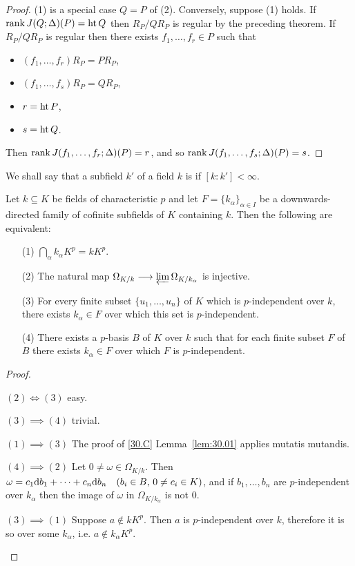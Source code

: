 \documentclass[../main]{subfiles}
\begin{document}
\begin{proof}
(1) is a special case $Q = P$ of (2). Conversely, suppose (1) holds. If $\operatorname{rank} J(Q; \Delta)(P) = \operatorname{ht} Q$ then $R_P/Q R_P$ is regular by the preceding theorem. If $R_P/Q R_P$ is regular then there exists $f_1, \ldots, f_r \in P$ such that
\begin{itemize}
    \item $(f_1, \ldots, f_r)R_P = PR_P$,
    \item  $(f_1, \ldots, f_s)R_P = Q R_P$,
    \item  $r = \operatorname{ht} P$,
    \item  $s = \operatorname{ht} Q$.
\end{itemize}
 Then $\operatorname{rank} J(f_1, \dots, f_r; \Delta)(P) = r$, and so $\operatorname{rank} J(f_1, \dots, f_s; \Delta)(P) = s$.
\end{proof}

\newparagraph We shall say that a subfield $k'$ of a field $k$ is  if $[k : k'] < \infty$.

\begin{lemma}
\label{lem:40.1}
Let $k \subseteq K$ be fields of characteristic $p$ and let $F = \{k_\alpha\}_{\alpha \in I}$ be a downwards-directed family of cofinite subfields of $K$ containing $k$. Then the following are equivalent:
\begin{enumerate}
    \item[(1)] $\bigcap\limits_\alpha k_\alpha K^p = k K^p$.
    \item[(2)] The natural map $\Omega_{K/k} \longrightarrow \varprojlim \Omega_{K/k_\alpha}$ is injective.
    \item[(3)] For every finite subset $\{u_1, \ldots, u_n\}$ of $K$ which is $p$-independent over $k$, there exists $k_\alpha \in F$ over which this set is $p$-independent. 
    \item[(4)] There exists a $p$-basis $B$ of $K$ over $k$ such that for each finite subset $F$ of $B$ there exists $k_\alpha \in F$ over which $F$ is $p$-independent. 
\end{enumerate}
\end{lemma}

\begin{proof}\phantom{,}
\begin{implyenumerate}
    \item[$(2) \iff (3)$] easy.
    \item[$(3) \implies (4)$] trivial.
    \item[$(1) \implies (3)$] The proof of \ref{30.C} Lemma~\ref{lem:30.01} applies mutatis mutandis. 
    \item[$(4) \implies (2)$] Let $0 \ne \omega \in \Omega_{K/k}$. Then $\omega = c_1 \dd b_1 + \ldots + c_n \dd b_n\for{b_i \in B,\, 0 \ne c_i \in K}$, and if $b_1, \ldots, b_n$ are $p$-independent over $k_\alpha$ then the image of $\omega$ in $\Omega_{K/k_\alpha}$ is not $0$.
    \item[$(3) \implies (1)$] Suppose $a \not \in k K^p$. Then $a$ is $p$-independent over $k$, therefore it is so over some $k_\alpha$, i.e. $a \not \in k_\alpha K^p$. 
\end{implyenumerate}
\end{proof}
\end{document}
